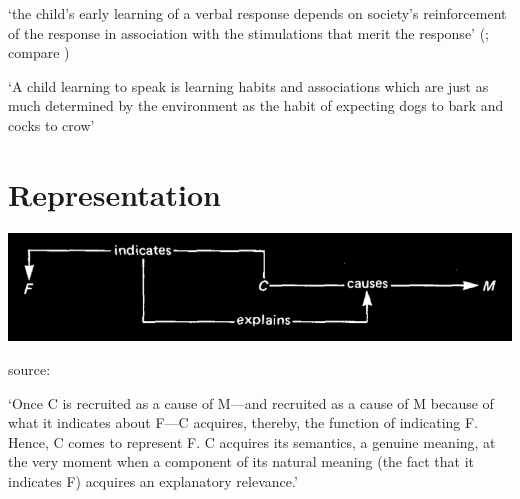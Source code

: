 \documentclass[12pt]{extarticle}
\begin{document}
\begin{multicols}{3}
‘the child's early learning of a verbal response depends on society's reinforcement of the response in association with the stimulations that merit the response’
(\citeyear[p.\ 82]{Quine:1960fe}; compare \citeyear[pp.\ 28--9]{Quine:1974rd})
 
‘A child learning to speak is learning habits and associations which are just as much determined by the environment as the habit of expecting dogs to bark and cocks to crow’
\citep[p.\ 71]{Russell:1921ww}
 
 
 
\section{Representation}
 
\begin{center}
\includegraphics[scale=0.3]{../slides/src/files/img/dretske_1988_fig4.1.png}
\end{center}
source: \citep[p.\ 84, figure 4.1]{Dretske:1988sq}
 
‘Once C is recruited as a cause of M---and recruited as a cause of M because of what it indicates about F---C acquires, thereby, the function of indicating F. Hence, C comes to represent F. C acquires its semantics, a genuine meaning, at the very moment when a component of its natural meaning (the fact that it indicates F) acquires an explanatory relevance.’
\citep[p.\ 84]{Dretske:1988sq}
 
 
 
\footnotesize 


\end{multicols}
\end{document}

